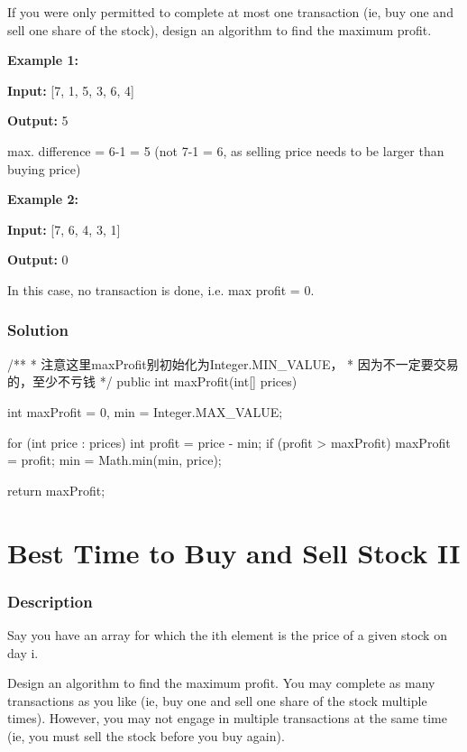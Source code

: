 If you were only permitted to complete at most one transaction (ie, buy one and sell one share of the stock), design an algorithm to find the maximum profit.

\textbf{Example 1:}

\textbf{Input:} [7, 1, 5, 3, 6, 4]

\textbf{Output:} 5

max. difference = 6-1 = 5 (not 7-1 = 6, as selling price needs to be larger than buying price)

\textbf{Example 2:}

\textbf{Input:} [7, 6, 4, 3, 1]

\textbf{Output:} 0

In this case, no transaction is done, i.e. max profit = 0.

\subsubsection{Solution}

\begin{Code}
/**
 * 注意这里maxProfit别初始化为Integer.MIN_VALUE，
 * 因为不一定要交易的，至少不亏钱
 */
public int maxProfit(int[] prices) {
    int maxProfit = 0, min = Integer.MAX_VALUE;

    for (int price : prices) {
        int profit = price - min;
        if (profit > maxProfit) {
            maxProfit = profit;
        }
        min = Math.min(min, price);
    }

    return maxProfit;
}
\end{Code}

\newpage

\section{Best Time to Buy and Sell Stock II} %

\subsubsection{Description}
Say you have an array for which the ith element is the price of a given stock on day i.

Design an algorithm to find the maximum profit. You may complete as many transactions as you like (ie, buy one and sell one share of the stock multiple times). However, you may not engage in multiple transactions at the same time (ie, you must sell the stock before you buy again).

